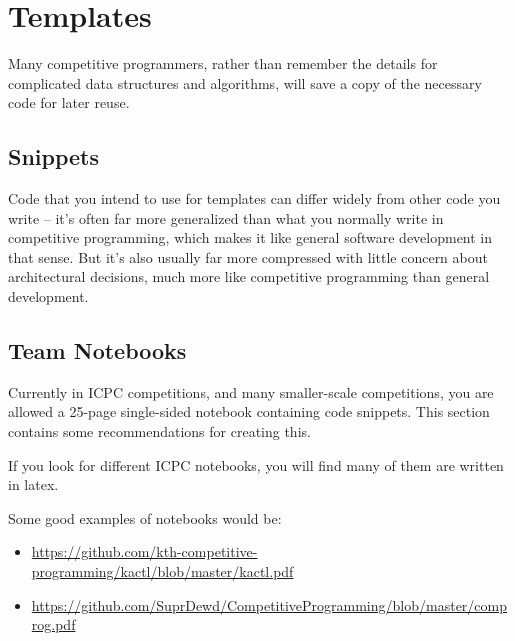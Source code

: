 \section{Templates}

Many competitive programmers, rather than remember the details for complicated data structures and algorithms, will save a copy of the necessary code for later reuse.

\subsection{Snippets}

Code that you intend to use for templates can differ widely from other code you write -- it's often far more generalized than what you normally write in competitive programming, which makes it like general software development in that sense. But it's also usually far more compressed with little concern about architectural decisions, much more like competitive programming than general development.

\subsection{Team Notebooks}

Currently in ICPC competitions, and many smaller-scale competitions, you are allowed a 25-page single-sided notebook containing code snippets. This section contains some recommendations for creating this.

If you look for different ICPC notebooks, you will find many of them are written in latex.

Some good examples of notebooks would be:

\begin{itemize}
\item \url{https://github.com/kth-competitive-programming/kactl/blob/master/kactl.pdf}
\item \url{https://github.com/SuprDewd/CompetitiveProgramming/blob/master/comprog.pdf}
\end{itemize}
